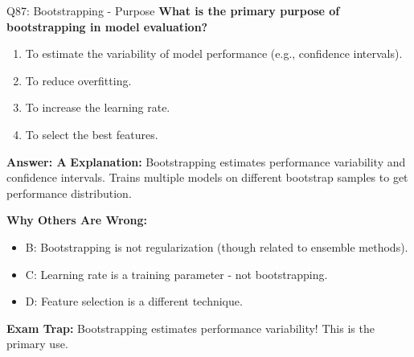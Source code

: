 \documentclass[8pt]{beamer}
\begin{document}
	\begin{frame}{Q87: Bootstrapping - Purpose}
		\fontsize{6.5}{7.5}\selectfont
		\textbf{What is the primary purpose of bootstrapping in model evaluation?}
		
		\begin{enumerate}
			\item To estimate the variability of model performance (e.g., confidence intervals).
			\item To reduce overfitting.
			\item To increase the learning rate.
			\item To select the best features.
		\end{enumerate}
		
		\vspace{0.05cm}
		\textcolor{myblue}{\textbf{Answer: A}}
		\vspace{0.05cm}
		\textcolor{myblue}{\textbf{Explanation:}} Bootstrapping estimates performance variability and confidence intervals. Trains multiple models on different bootstrap samples to get performance distribution.
		
		\vspace{0.05cm}
		\textcolor{myred}{\textbf{Why Others Are Wrong:}}
		\begin{itemize}
			\item \textcolor{myred}{B:} Bootstrapping is not regularization (though related to ensemble methods).
			\item \textcolor{myred}{C:} Learning rate is a training parameter - not bootstrapping.
			\item \textcolor{myred}{D:} Feature selection is a different technique.
		\end{itemize}
		
		\textcolor{myred}{\textbf{Exam Trap:}} Bootstrapping estimates \textcolor{myblue}{performance variability}! This is the primary use.
	\end{frame}
	
\end{document}
